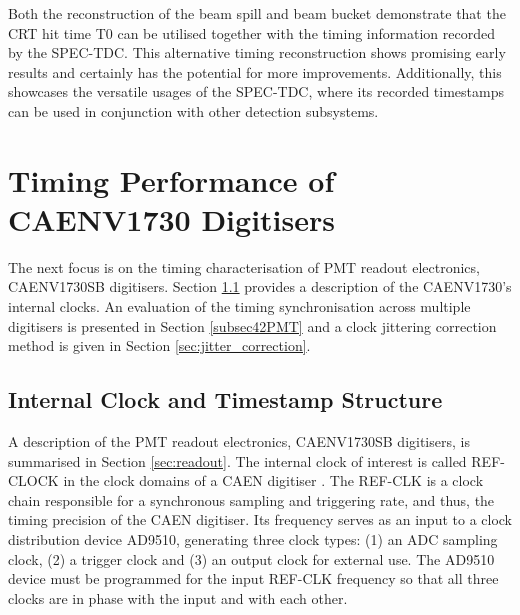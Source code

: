 Both the reconstruction of the beam spill and beam bucket demonstrate that the CRT hit time T0 can be utilised together with the timing information recorded by the SPEC-TDC.
This alternative timing reconstruction shows promising early results and certainly has the potential for more improvements.
Additionally, this showcases the versatile usages of the SPEC-TDC, where its recorded timestamps can be used in conjunction with other detection subsystems. 

\section{Timing Performance of CAENV1730 Digitisers}
\label{sec4PMT}

The next focus is on the timing characterisation of PMT readout electronics, CAENV1730SB digitisers. 
Section \ref{subsec41PMT} provides a description of the CAENV1730's internal clocks.
An evaluation of the timing synchronisation across multiple digitisers is presented in Section \ref{subsec42PMT} and a clock jittering correction method is given in Section \ref{sec:jitter_correction}.

\subsection{Internal Clock and Timestamp Structure}
\label{subsec41PMT}



A description of the PMT readout electronics, CAENV1730SB digitisers, is summarised in Section \ref{sec:readout}.
The internal clock of interest is called REF-CLOCK in the clock domains of a CAEN digitiser \cite{caen1730}.
The REF-CLK is a clock chain responsible for a synchronous sampling and triggering rate, and thus, the timing precision of the CAEN digitiser.
Its frequency serves as an input to a clock distribution device AD9510, generating three clock types: (1) an ADC sampling clock, (2) a trigger clock and (3) an output clock for external use.
The AD9510 device must be programmed for the input REF-CLK frequency so that all three clocks are in phase with the input and with each other.


